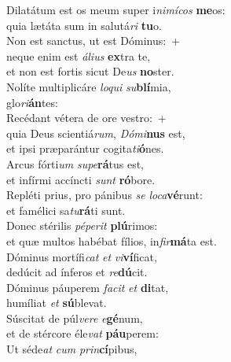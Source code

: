 \evenverse Dilatátum est os meum super i\textit{ni}\textit{mí}\textit{cos} \textbf{me}os:~\*\\
\evenverse quia lætáta sum in salutá\textit{ri} \textbf{tu}o.\\
\oddverse Non est sanctus, ut est Dóminus:~+\\
\oddverse  neque enim est \textit{á}\textit{li}\textit{us} \textbf{ex}tra te,~\*\\
\oddverse et non est fortis sicut De\textit{us} \textbf{no}ster.\\
\evenverse Nolíte multiplicáre \textit{lo}\textit{qui} \textit{su}\textbf{blí}mia,~\*\\
\evenverse glo\textit{ri}\textbf{án}tes:\\
\oddverse Recédant vétera de ore vestro:~+\\
\oddverse  quia Deus scientiá\textit{rum}, \textit{Dó}\textit{mi}\textbf{nus} est,~\*\\
\oddverse et ipsi præparántur cogita\textit{ti}\textbf{ó}nes.\\
\evenverse Arcus fórti\textit{um} \textit{su}\textit{pe}\textbf{rá}tus est,~\*\\
\evenverse et infírmi accíncti \textit{sunt} \textbf{ró}bore.\\
\oddverse Repléti prius, pro pánibus \textit{se} \textit{lo}\textit{ca}\textbf{vé}runt:~\*\\
\oddverse et famélici sa\textit{tu}\textbf{rá}ti sunt.\\
\evenverse Donec stérilis \textit{pé}\textit{pe}\textit{rit} \textbf{plú}rimos:~\*\\
\evenverse et quæ multos habébat fílios, in\textit{fir}\textbf{má}ta est.\\
\oddverse Dóminus mortífi\textit{cat} \textit{et} \textit{vi}\textbf{ví}ficat,~\*\\
\oddverse dedúcit ad ínferos et \textit{re}\textbf{dú}cit.\\
\evenverse Dóminus páuperem \textit{fa}\textit{cit} \textit{et} \textbf{di}tat,~\*\\
\evenverse humíliat \textit{et} \textbf{sú}blevat.\\
\oddverse Súscitat de púl\textit{ve}\textit{re} \textit{e}\textbf{gé}num,~\*\\
\oddverse et de stércore éle\textit{vat} \textbf{páu}perem:\\
\evenverse Ut séde\textit{at} \textit{cum} \textit{prin}\textbf{cí}pibus,~\*\\
